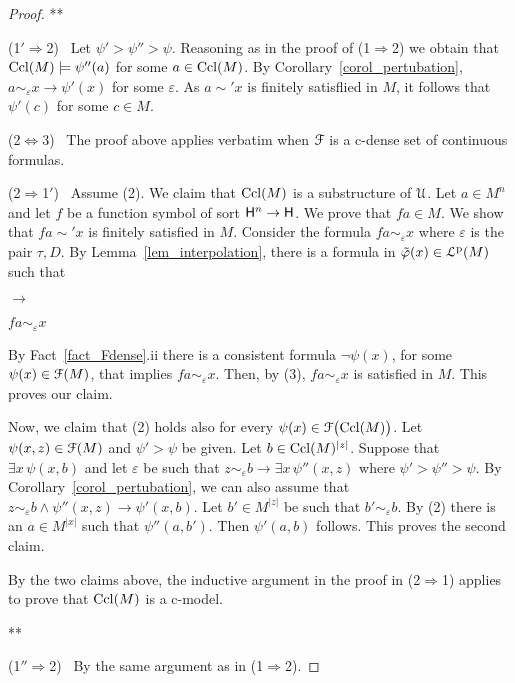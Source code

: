 \documentclass{amsproc}
\begin{document}
{\begin{proof}
\hfil***

  (1$'\!\Rightarrow$2) \ 
  Let $\psi'>\psi''>\psi$.
  Reasoning as in the proof of (1$\Rightarrow$2) we obtain that ${\rm Ccl}(M)\models\psi''(a)$ for some $a\in{\rm Ccl}(M)$.
  By Corollary~\ref{corol_pertubation}, $a\sim_\varepsilon x\rightarrow\psi'(x)$ for some $\varepsilon$.
  As $a\sim'x$ is finitely satisflied in $M$, it follows that $\psi'(c)$ for some $c\in M$.

  (2$\Leftrightarrow$3) \ 
  The proof above applies verbatim when ${\EuScript F}$ is a c-dense set of continuous formulas.
  
  (2$\Rightarrow$1$'$) \ 
  Assume (2).
  We claim that ${\rm Ccl}(M)$ is a substructure of ${\EuScript U}$.  
  Let $a\in M^{n}$ and let $f$ be a function symbol of sort ${\sf H}^{n}\to{\sf H}$.
  We prove that $fa\in M$.
  We show that $fa\sim' x$ is finitely satisfied in $M$.
  Consider the formula $fa\sim_\varepsilon  x$ where $\varepsilon$ is the pair $\tau,D$.
  By Lemma~\ref{lem_interpolation}, there is a formula in $\tilde\varphi(x)\in{\EuScript L}^{\rm p}(M)$ such that
  
  \ceq{\hfill fa\sim_\tau x}{\rightarrow}{\neg\tilde\varphi(x)}\parbox{6ex}{\hfil$\rightarrow$}$fa\sim_\varepsilon  x$

  By Fact~\ref{fact_Fdense}.ii there is a consistent formula  $\neg\psi(x)$, for some $\psi(x)\in{\EuScript F}(M)$, that implies $fa\sim_\varepsilon  x$.
  Then, by (3), $fa\sim_\varepsilon  x$ is satisfied in $M$.
  This proves our claim.

  Now, we claim that (2) holds also for every $\psi(x)\in{\EuScript F}\big({\rm Ccl}(M)\big)$.
  Let $\psi(x,z)\in{\EuScript F}(M)$ and $\psi'>\psi$ be given.
  Let $b\in{\rm Ccl}(M)^{|z|}$.
  Suppose that $\exists x\,\psi(x,b)$ and let $\varepsilon$ be such that $z\sim_\varepsilon b\rightarrow\exists x\,\psi''(x,z)$ where $\psi'>\psi''>\psi$.
  By Corollary~\ref{corol_pertubation}, we can also assume that $z\sim_\varepsilon b\wedge\psi''(x,z)\rightarrow\psi'(x,b)$. 
  Let $b'\in M^{|z|}$ be such that $b'\sim_\varepsilon b$.
  By (2) there is an $a\in M^{|x|}$ such that $\psi''(a,b')$.
  Then $\psi'(a,b)$ follows.
  This proves the second claim.

  By the two claims above, the inductive argument in the proof in (2$\Rightarrow$1) applies to prove that ${\rm Ccl}(M)$ is a c-model.

  \hfil***

  (1$''\!\Rightarrow$2) \ 
  By the same argument as in (1$\Rightarrow$2).



\end{proof}}
\end{document}
